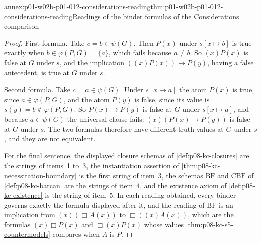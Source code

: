 \begin{annexitem}{annex:p01-w02b-p01-012-considerations-reading}{thm:p01-w02b-p01-012-considerations-reading}{Readings of the binder formulas of the Considerations comparison}
\begin{proof}
First formula.  Take \(c=b\in\psi(G)\).  Then \(P(x)\) under
\(s[x\mapsto b]\) is true exactly when \(b\in\varphi(P,G)=\{a\}\), which
fails because \(a\ne b\).  So \((x)P(x)\) is false at \(G\) under \(s\),
and the implication \(((x)P(x))\to P(y)\), having a false antecedent, is
true at \(G\) under \(s\).

Second formula.  Take \(c=a\in\psi(G)\).  Under \(s[x\mapsto a]\) the
atom \(P(x)\) is true, since \(a\in\varphi(P,G)\), and the atom \(P(y)\)
is false, since its value is \(s(y)=b\notin\varphi(P,G)\).  So
\(P(x)\to P(y)\) is false at \(G\) under \(s[x\mapsto a]\), and because
\(a\in\psi(G)\) the universal clause fails: \((x)(P(x)\to P(y))\) is false
at \(G\) under \(s\).  The two formulas therefore have different truth
values at \(G\) under \(s\), and they are not equivalent.

For the final sentence, the displayed closure schemas of
\cref{def:p08-kc-closures} are the strings of items~1 to~3, the
instantiation assertion of \cref{thm:p08-kc-necessitation-boundary} is the
first string of item~3, the schemas \(\mathrm{BF}\) and \(\mathrm{CBF}\)
of \cref{def:p08-kc-barcan} are the strings of item~4, and the existence
axiom of \cref{def:p08-kc-existence} is the string of item~5.  In each
reading obtained, every binder governs exactly the formula displayed after
it, and the reading of \(\mathrm{BF}\) is an implication from
\((x)(\Box A(x))\) to \(\Box((x)A(x))\), which are the formulas
\((x)\Box P(x)\) and \(\Box(x)P(x)\) whose values
\cref{thm:p08-kc-s5-countermodels} compares when \(A\) is \(P\).
\end{proof}
\end{annexitem}
